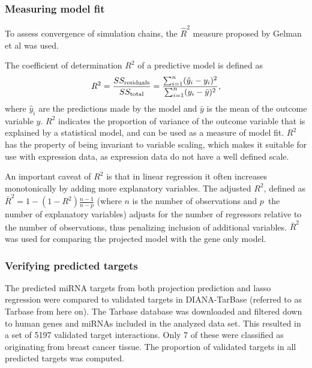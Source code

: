 \subsubsection{Measuring model fit}

To assess convergence of simulation chains, the $\hat{R}^2$ measure proposed
by Gelman et al was used.

The coefficient of determination $R^2$ of a predictive model is defined as
\begin{equation}
	R^2 = \frac{SS_{\textup{residuals}}}{SS_{\textup{total}}} = \frac{\sum_{i=1}^{n}(\hat{y}_i-y_i)^2}{\sum_{i=1}^{n}(y_i-\bar{y})^2},
\end{equation}
where $\hat{y}_i$ are the predictions made by the model and $\bar{y}$ is the
mean of the outcome variable $y$. $R^2$ indicates the proportion of variance
of the outcome variable that is explained by a statistical model, and can be
used as a measure of model fit. $R^2$ has the property of being invariant to
variable scaling, which makes it suitable for use with expression data, as
expression data do not have a well defined scale.

An important caveat of $R^2$ is that in linear regression it often increases
monotonically by adding more explanatory variables. The adjusted $R^2$,
defined as $\bar{R}^2 = 1-(1-R^2)\frac{n-1}{n-p}$ (where $n$ is the number of
observations and $p$ the number of explanatory variables) adjusts for the
number of regressors relative to the number of observations, thus penalizing
inclusion of additional variables. $\bar{R}^2$ was used for comparing the
projected model with the gene only model.



\subsubsection{Verifying predicted targets}

The predicted miRNA targets from both projection prediction and lasso
regression were compared to validated targets in DIANA-TarBase
\citep{Vlachos2015} (referred to as Tarbase from here on). The Tarbase
database was downloaded and filtered down to human genes and miRNAs included
in the analyzed data set. This resulted in a set of 5197 validated target
interactions. Only 7 of these were classified as originating from breast
cancer tissue. The proportion of validated targets in all predicted targets
was computed.
